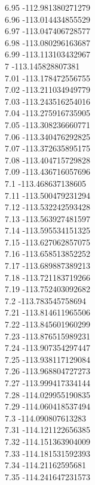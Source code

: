 {6.95	-112.981380271279\\
6.96	-113.014434855529\\
6.97	-113.047406728577\\
6.98	-113.080296163687\\
6.99	-113.113103432967\\
7	-113.145828807381\\
7.01	-113.178472556755\\
7.02	-113.211034949779\\
7.03	-113.243516254016\\
7.04	-113.275916735905\\
7.05	-113.308236660771\\
7.06	-113.340476292825\\
7.07	-113.372635895175\\
7.08	-113.404715729828\\
7.09	-113.436716057696\\
7.1	-113.468637138605\\
7.11	-113.500479231294\\
7.12	-113.532242593428\\
7.13	-113.563927481597\\
7.14	-113.595534151325\\
7.15	-113.627062857075\\
7.16	-113.658513852252\\
7.17	-113.689887389213\\
7.18	-113.721183719266\\
7.19	-113.752403092682\\
7.2	-113.783545758694\\
7.21	-113.814611965506\\
7.22	-113.845601960299\\
7.23	-113.876515989231\\
7.24	-113.907354297447\\
7.25	-113.938117129084\\
7.26	-113.968804727273\\
7.27	-113.999417334144\\
7.28	-114.029955190835\\
7.29	-114.060418537494\\
7.3	-114.090807613283\\
7.31	-114.121122656385\\
7.32	-114.151363904009\\
7.33	-114.181531592393\\
7.34	-114.21162595681\\
7.35	-114.241647231573\\
}
